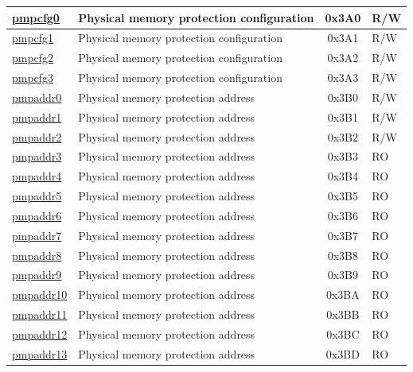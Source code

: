\begin{longtable}{ | p{4.0cm} | p{8.4cm} | c | l | }
\hyperref[sec:riscvcpu-pmp-reg-desc]{pmpcfg0} & Physical memory protection configuration & 0x3A0 & R/W \\\hline
\hyperref[sec:riscvcpu-pmp-reg-desc]{pmpcfg1} & Physical memory protection configuration & 0x3A1 & R/W \\\hline
\hyperref[sec:riscvcpu-pmp-reg-desc]{pmpcfg2} & Physical memory protection configuration & 0x3A2 & R/W \\\hline
\hyperref[sec:riscvcpu-pmp-reg-desc]{pmpcfg3} & Physical memory protection configuration & 0x3A3 & R/W \\\hline
\hyperref[sec:riscvcpu-pmp-reg-desc]{pmpaddr0} & Physical memory protection address & 0x3B0 & R/W \\\hline
\hyperref[sec:riscvcpu-pmp-reg-desc]{pmpaddr1} & Physical memory protection address & 0x3B1 & R/W \\\hline
\hyperref[sec:riscvcpu-pmp-reg-desc]{pmpaddr2} & Physical memory protection address & 0x3B2 & R/W \\\hline
\hyperref[sec:riscvcpu-pmp-reg-desc]{pmpaddr3} & Physical memory protection address & 0x3B3 & RO \\\hline
\hyperref[sec:riscvcpu-pmp-reg-desc]{pmpaddr4} & Physical memory protection address & 0x3B4 & RO \\\hline
\hyperref[sec:riscvcpu-pmp-reg-desc]{pmpaddr5} & Physical memory protection address & 0x3B5 & RO \\\hline
\hyperref[sec:riscvcpu-pmp-reg-desc]{pmpaddr6} & Physical memory protection address & 0x3B6 & RO \\\hline
\hyperref[sec:riscvcpu-pmp-reg-desc]{pmpaddr7} & Physical memory protection address & 0x3B7 & RO \\\hline
\hyperref[sec:riscvcpu-pmp-reg-desc]{pmpaddr8} & Physical memory protection address & 0x3B8 & RO \\\hline
\hyperref[sec:riscvcpu-pmp-reg-desc]{pmpaddr9} & Physical memory protection address & 0x3B9 & RO \\\hline
\hyperref[sec:riscvcpu-pmp-reg-desc]{pmpaddr10} & Physical memory protection address & 0x3BA & RO \\\hline
\hyperref[sec:riscvcpu-pmp-reg-desc]{pmpaddr11} & Physical memory protection address & 0x3BB & RO \\\hline
\hyperref[sec:riscvcpu-pmp-reg-desc]{pmpaddr12} & Physical memory protection address & 0x3BC & RO \\\hline
\hyperref[sec:riscvcpu-pmp-reg-desc]{pmpaddr13} & Physical memory protection address & 0x3BD & RO \\\hline

\end{longtable}

